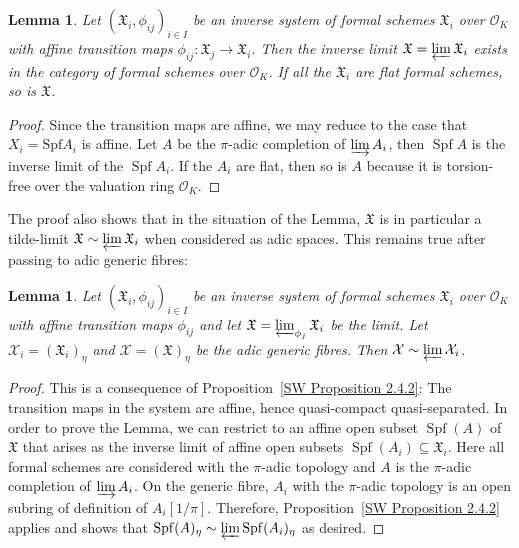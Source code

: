 \documentclass[10pt,oneside]{amsart}
\newtheorem{lemma}[theorem]{Lemma}
\theoremstyle{definition}
\begin{document}
	\begin{lemma} \label{lemma:inverse_limit_formal}
		Let $(\mathfrak X_i,\phi_{ij})_{i\in I}$ be an inverse system of formal schemes $\mathfrak X_i$ over $\mathcal O_K$ with affine transition maps $\phi_{ij}:\mathfrak X_j\rightarrow \mathfrak X_i$. Then the inverse limit $\mathfrak X=\varprojlim \mathfrak X_i$ exists in the category of formal schemes over $\mathcal O_K$. If all the $\mathfrak X_i$ are flat formal schemes, so is $\mathfrak X$.
	\end{lemma}
	\begin{proof}
		Since the transition maps are affine, we may reduce to the case that $X_i=\mathrm{Spf} A_i$ is affine.
	Let $A$ be the $\pi$-adic completion of $\varinjlim A_i$, then  $\operatorname{Spf} A$ is the inverse limit of the $\operatorname{Spf}A_i$. If the $A_i$ are flat, then so is $A$ because it is torsion-free over the valuation ring $\mathcal O_K$.
	\end{proof}
	
	The proof also shows that in the situation of the Lemma, $\mathfrak X$ is in particular a tilde-limit  $\mathfrak X\sim \varprojlim \mathfrak X_i$ when considered as adic spaces. This remains true after passing to adic generic fibres:
	
	\begin{lemma}\label{tilde-limit from adic generic fibre of formal schemes}
		Let $(\mathfrak X_i,\phi_{ij})_{i\in I}$ be an inverse system of formal schemes $\mathfrak X_i$ over $\mathcal O_K$ with affine transition maps $\phi_{ij}$ and let $\mathfrak X=\varprojlim_{\phi_j} \mathfrak X_i$ be the limit. Let $\mathcal X_i =(\mathfrak X_i)_\eta$ and  $\mathcal X = (\mathfrak X)_\eta$ be the adic generic fibres. Then $\mathcal X \sim \varprojlim \mathcal X_i$.
	\end{lemma}
	\begin{proof}
		This is a consequence of Proposition~\ref{SW Proposition 2.4.2}: The transition maps in the system are affine, hence quasi-compact quasi-separated. In order to prove the Lemma, we can restrict to an affine open subset $\operatorname{Spf}(A)$ of $\mathfrak X$ that arises as the inverse limit of affine open subsets $\operatorname{Spf}(A_i)\subseteq \mathfrak X_i$. Here all formal schemes are considered with the $\pi$-adic topology and $A$ is the $\pi$-adic completion of $\varinjlim A_i$. 
		On the generic fibre, $A_i$ with the $\pi$-adic topology is an open subring of definition of $A_i[1/\pi]$. Therefore, Proposition~\ref{SW Proposition 2.4.2} applies and shows that $\operatorname{Spf}(A)_\eta \sim \varprojlim \operatorname{Spf}(A_i)_\eta$ as desired.
	\end{proof}
	
\end{document}
